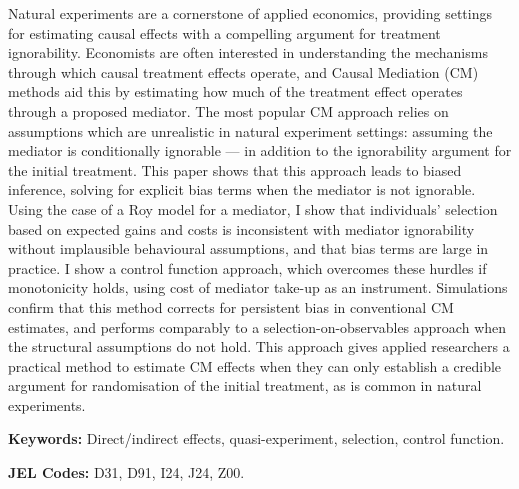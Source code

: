 \noindent
Natural experiments are a cornerstone of applied economics, providing settings for estimating causal effects with a compelling argument for treatment ignorability.
Economists are often interested in understanding the mechanisms through which causal treatment effects operate, and Causal Mediation (CM) methods aid this by estimating how much of the treatment effect operates through a proposed mediator.
The most popular CM approach relies on assumptions which are unrealistic in natural experiment settings: assuming the mediator is conditionally ignorable --- in addition to the ignorability argument for the initial treatment.
This paper shows that this approach leads to biased inference, solving for explicit bias terms when the mediator is not ignorable.
Using the case of a Roy model for a mediator, I show that individuals' selection based on expected gains and costs is inconsistent with mediator ignorability without implausible behavioural assumptions, and that bias terms are large in practice.
I show a control function approach, which overcomes these hurdles if monotonicity holds, using cost of mediator take-up as an instrument.
Simulations confirm that this method corrects for persistent bias in conventional CM estimates, and performs comparably to a selection-on-observables approach when the structural assumptions do not hold.
This approach gives applied researchers a practical method to estimate CM effects when they can only establish a credible argument for randomisation of the initial treatment, as is common in natural experiments.

\vspace{0.5cm}
\noindent
\textbf{Keywords:}
Direct/indirect effects, quasi-experiment, selection, control function.

\vspace{0.1cm}
\noindent
\textbf{JEL Codes:}
D31, D91, I24, J24, Z00.
